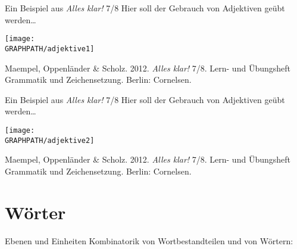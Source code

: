\begin{frame}
  {Ein Beispiel aus \textit{Alles klar!} 7\slash 8}
  \pause
  Hier soll der Gebrauch von \alert{Adjektiven} geübt werden\ldots
  \pause
  \begin{center}
    \texttt{[image: \\GRAPHPATH/adjektive1]}
  \end{center}
  \tiny Maempel, Oppenländer \& Scholz. 2012. \textit{Alles klar!} 7\slash 8. Lern- und Übungsheft Grammatik und Zeichensetzung. Berlin: Cornelsen.
\end{frame}


\begin{frame}
  {Ein Beispiel aus \textit{Alles klar!} 7\slash 8}
  Hier soll der Gebrauch von \alert{Adjektiven} geübt werden\ldots
  \begin{center}
    \texttt{[image: \\GRAPHPATH/adjektive2]}
  \end{center}
  \tiny Maempel, Oppenländer \& Scholz. 2012. \textit{Alles klar!} 7\slash 8. Lern- und Übungsheft Grammatik und Zeichensetzung. Berlin: Cornelsen.
\end{frame}





\section{Wörter}

\begin{frame}
  {Ebenen und Einheiten}
  \pause
  Kombinatorik von Wortbestandteilen und von Wörtern:
  \pause
  \Zeile
  \begin{exe}
    \ex
    \begin{xlist}
      \pause
    \end{xlist}
    \pause
    \Zeile
    \ex
    \begin{xlist}
      \pause
    \end{xlist}
  \end{exe}
\end{frame}

